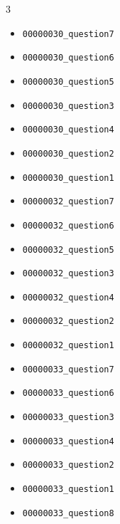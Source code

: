 \begin{multicols}{3}
\begin{itemize}[nosep, leftmargin=*]
        

        \item \texttt{00000030\_question7}
        \item \texttt{00000030\_question6}
        \item \texttt{00000030\_question5}
        \item \texttt{00000030\_question3}
        \item \texttt{00000030\_question4}
        \item \texttt{00000030\_question2}
        \item \texttt{00000030\_question1}
        
        

        \item \texttt{00000032\_question7}
        \item \texttt{00000032\_question6}
        \item \texttt{00000032\_question5}
        \item \texttt{00000032\_question3}
        \item \texttt{00000032\_question4}
        \item \texttt{00000032\_question2}
        \item \texttt{00000032\_question1}
        
        

        \item \texttt{00000033\_question7}
        \item \texttt{00000033\_question6}
        \item \texttt{00000033\_question3}
        \item \texttt{00000033\_question4}
        \item \texttt{00000033\_question2}
        \item \texttt{00000033\_question1}
        \item \texttt{00000033\_question8}
        
        


\end{itemize}
\end{multicols}
